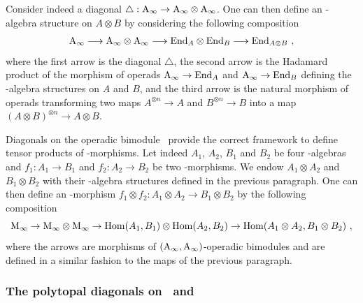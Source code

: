 \documentclass[twoside, 12pt]{amsart}
\theoremstyle{remark}
\begin{document}
Consider indeed a diagonal $\triangle : \mathrm{A}_\infty \rightarrow \mathrm{A}_\infty \otimes \mathrm{A}_\infty$. One can then define an \Ainf -algebra structure on $A \otimes B$ by considering the following composition
\[ \mathrm{A}_\infty \longrightarrow \mathrm{A}_\infty \otimes \mathrm{A}_\infty \longrightarrow \mathrm{End}_A \otimes \mathrm{End}_B \longrightarrow \mathrm{End}_{A \otimes B} \ , \]
where the first arrow is the diagonal $\triangle$, the second arrow is the Hadamard product of the morphism of operads $\mathrm{A}_\infty \rightarrow \mathrm{End}_A$ and $\mathrm{A}_\infty \rightarrow \mathrm{End}_B$ defining the \Ainf -algebra structures on $A$ and $B$, and the third arrow is the natural morphism of operads transforming two maps $A^{\otimes n} \rightarrow A$ and $B^{\otimes n} \rightarrow B$ into a map $(A\otimes B)^{\otimes n} \rightarrow A \otimes B$.

Diagonals on the operadic bimodule \Minf\ provide the correct framework to define tensor products of \Ainf -morphisms. Let indeed $A_1$, $A_2$, $B_1$ and $B_2$ be four \Ainf -algebras and $f_1 : A_1 \rightarrow B_1$ and $f_2 : A_2 \rightarrow B_2$ be two \Ainf -morphisms. We endow $A_1 \otimes A_2$ and $B_1 \otimes B_2$ with their \Ainf -algebra structures defined in the previous paragraph. 
One can then define an \Ainf -morphism $f_1 \otimes f_2 : A_1 \otimes A_2 \rightarrow B_1 \otimes B_2$ by the following composition
\[ \Minf \rightarrow \Minf \otimes \Minf \rightarrow \Hom (A_1 , B_1) \otimes \Hom (A_2,B_2) \rightarrow  \Hom (A_1 \otimes A_2 , B_1 \otimes B_2) \ , \]
where the arrows are morphisms of $(\mathrm{A}_\infty , \mathrm{A}_\infty )$-operadic bimodules and are defined in a similar fashion to the maps of the previous paragraph.

\subsubsection{The polytopal diagonals on \Ainf\ and \Minf}
\end{document}
